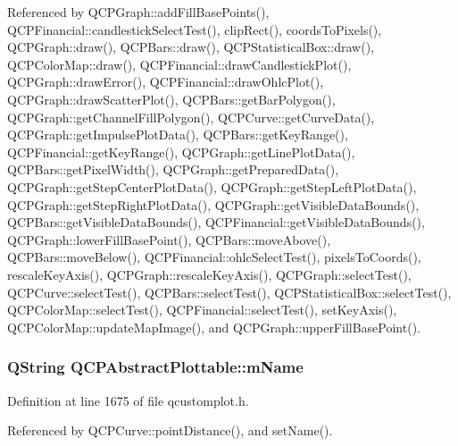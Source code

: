Referenced by Q\+C\+P\+Graph\+::add\+Fill\+Base\+Points(), Q\+C\+P\+Financial\+::candlestick\+Select\+Test(), clip\+Rect(), coords\+To\+Pixels(), Q\+C\+P\+Graph\+::draw(), Q\+C\+P\+Bars\+::draw(), Q\+C\+P\+Statistical\+Box\+::draw(), Q\+C\+P\+Color\+Map\+::draw(), Q\+C\+P\+Financial\+::draw\+Candlestick\+Plot(), Q\+C\+P\+Graph\+::draw\+Error(), Q\+C\+P\+Financial\+::draw\+Ohlc\+Plot(), Q\+C\+P\+Graph\+::draw\+Scatter\+Plot(), Q\+C\+P\+Bars\+::get\+Bar\+Polygon(), Q\+C\+P\+Graph\+::get\+Channel\+Fill\+Polygon(), Q\+C\+P\+Curve\+::get\+Curve\+Data(), Q\+C\+P\+Graph\+::get\+Impulse\+Plot\+Data(), Q\+C\+P\+Bars\+::get\+Key\+Range(), Q\+C\+P\+Financial\+::get\+Key\+Range(), Q\+C\+P\+Graph\+::get\+Line\+Plot\+Data(), Q\+C\+P\+Bars\+::get\+Pixel\+Width(), Q\+C\+P\+Graph\+::get\+Prepared\+Data(), Q\+C\+P\+Graph\+::get\+Step\+Center\+Plot\+Data(), Q\+C\+P\+Graph\+::get\+Step\+Left\+Plot\+Data(), Q\+C\+P\+Graph\+::get\+Step\+Right\+Plot\+Data(), Q\+C\+P\+Graph\+::get\+Visible\+Data\+Bounds(), Q\+C\+P\+Bars\+::get\+Visible\+Data\+Bounds(), Q\+C\+P\+Financial\+::get\+Visible\+Data\+Bounds(), Q\+C\+P\+Graph\+::lower\+Fill\+Base\+Point(), Q\+C\+P\+Bars\+::move\+Above(), Q\+C\+P\+Bars\+::move\+Below(), Q\+C\+P\+Financial\+::ohlc\+Select\+Test(), pixels\+To\+Coords(), rescale\+Key\+Axis(), Q\+C\+P\+Graph\+::rescale\+Key\+Axis(), Q\+C\+P\+Graph\+::select\+Test(), Q\+C\+P\+Curve\+::select\+Test(), Q\+C\+P\+Bars\+::select\+Test(), Q\+C\+P\+Statistical\+Box\+::select\+Test(), Q\+C\+P\+Color\+Map\+::select\+Test(), Q\+C\+P\+Financial\+::select\+Test(), set\+Key\+Axis(), Q\+C\+P\+Color\+Map\+::update\+Map\+Image(), and Q\+C\+P\+Graph\+::upper\+Fill\+Base\+Point().

\hypertarget{class_q_c_p_abstract_plottable_ac29ffef424e2488675930de18cde612a}{}
\subsubsection[{m\+Name}]{\setlength{\rightskip}{0pt plus 5cm}Q\+String Q\+C\+P\+Abstract\+Plottable\+::m\+Name\hspace{0.3cm}{\ttfamily [protected]}}\label{class_q_c_p_abstract_plottable_ac29ffef424e2488675930de18cde612a}


Definition at line 1675 of file qcustomplot.\+h.



Referenced by Q\+C\+P\+Curve\+::point\+Distance(), and set\+Name().

